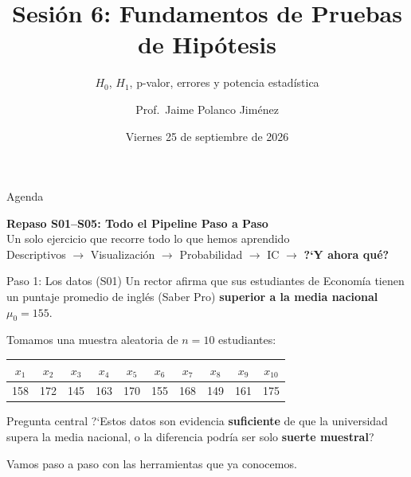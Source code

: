 \documentclass[aspectratio=169, 11pt]{beamer}
\title{Sesión 6: Fundamentos de Pruebas de Hipótesis}
\subtitle{$H_0$, $H_1$, p-valor, errores y potencia estad\'istica}
\author{Prof.\ Jaime Polanco Jim\'enez}
\date{Viernes 25 de septiembre de 2026}
\begin{document}
\begin{frame}
\titlepage
\end{frame}

\begin{frame}{Agenda}
\tableofcontents
\end{frame}

\begin{frame}{}
\vfill
\centering
{\Large\textbf{Repaso S01--S05: Todo el Pipeline Paso a Paso}}\\[1em]
{\normalsize Un solo ejercicio que recorre \alert{todo} lo que hemos aprendido}\\[0.5em]
{\small Descriptivos $\to$ Visualizaci\'on $\to$ Probabilidad $\to$ IC $\to$ \textbf{?`Y ahora qu\'e?}}
\vfill
\end{frame}

\begin{frame}{Paso 1: Los datos (S01)}
\small
Un rector afirma que sus estudiantes de Econom\'ia tienen un puntaje promedio de ingl\'es (Saber Pro) \textbf{superior a la media nacional} $\mu_0 = 155$.

\vspace{0.2cm}
Tomamos una muestra aleatoria de $n = 10$ estudiantes:

\begin{center}
\begin{tabular}{cccccccccc}
\toprule
$x_1$ & $x_2$ & $x_3$ & $x_4$ & $x_5$ & $x_6$ & $x_7$ & $x_8$ & $x_9$ & $x_{10}$ \\
\midrule
158 & 172 & 145 & 163 & 170 & 155 & 168 & 149 & 161 & 175 \\
\bottomrule
\end{tabular}
\end{center}

\vspace{0.2cm}
\begin{alertblock}{Pregunta central}
?`Estos datos son evidencia \textbf{suficiente} de que la universidad supera la media nacional, o la diferencia podr\'ia ser solo \textbf{suerte muestral}?
\end{alertblock}

Vamos paso a paso con las herramientas que ya conocemos.
\end{frame}
\end{document}
